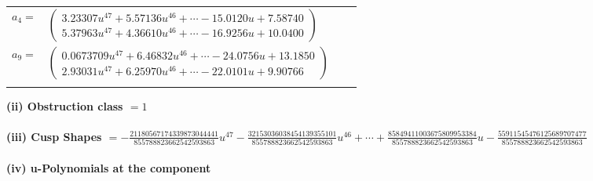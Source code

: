 \documentclass[1p]{elsarticle_modified}
\theoremstyle{definition}
\begin{document}
\begin{tabular}{m{7pt} m{180pt} m{7pt} m{180pt} }
\flushright $a_{4}=$&$\begin{pmatrix}3.23307 u^{47}+5.57136 u^{46}+\cdots-15.0120 u+7.58740\\5.37963 u^{47}+4.36610 u^{46}+\cdots-16.9256 u+10.0400\end{pmatrix}$ \\
\flushright $a_{9}=$&$\begin{pmatrix}0.0673709 u^{47}+6.46832 u^{46}+\cdots-24.0756 u+13.1850\\2.93031 u^{47}+6.25970 u^{46}+\cdots-22.0101 u+9.90766\end{pmatrix}$\\&\end{tabular}
\flushleft \textbf{(ii) Obstruction class $= 1$}\\~\\
\flushleft \textbf{(iii) Cusp Shapes $= -\frac{21180567174339873044441}{855788823662542593863} u^{47}-\frac{32153036038454139355101}{855788823662542593863} u^{46}+\cdots+\frac{85849411003675809953384}{855788823662542593863} u-\frac{55911545476125689707477}{855788823662542593863}$}\\~\\
\newpage\renewcommand{\arraystretch}{1}
\flushleft \textbf{(iv) u-Polynomials at the component}\newline \\
\end{document}
